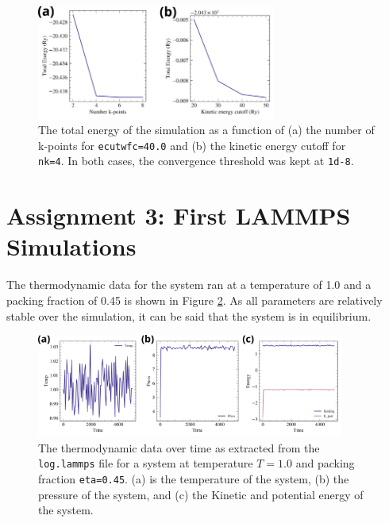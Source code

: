 \documentclass[10pt,a4paper]{labreport}
\begin{document}
\begin{enumerate}
    \begin{figure}[h]
      \centering 
      \includegraphics[width = 0.7\textwidth]{figs/ass2_energy-ecut_nks.png}
      \caption{The total energy of the simulation as a function of (a) the number of k-points for \texttt{ecutwfc=40.0} and (b) the kinetic energy cutoff for \texttt{nk=4}. In both cases, the convergence threshold was kept at \texttt{1d-8}.}
      \label{fig:ass2_energy-ecut_nks}
    \end{figure}

\end{enumerate}



\newpage
\section{Assignment 3: First LAMMPS Simulations}

The thermodynamic data for the system ran at a temperature of 1.0 and a packing fraction of 0.45 is shown in Figure \ref{fig:ass3_thermo}. As all parameters are relatively stable over the simulation, it can be said that the system is in equilibrium. 

\begin{figure}[htpb]
  \centering 
  \includegraphics[width = 0.9\textwidth]{figs/ass3_thermo.png}
  \caption{The thermodynamic data over time as extracted from the \texttt{log.lammps} file for a system at temperature $T=1.0$ and packing fraction \texttt{eta=0.45}. (a) is the temperature of the system, (b) the pressure of the system, and (c) the Kinetic and potential energy of the system.}
  \label{fig:ass3_thermo}
\end{figure}
\end{document}
